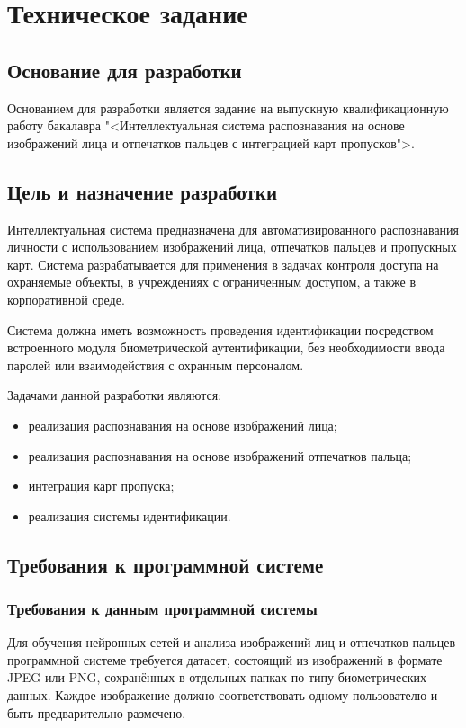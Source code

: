 \section{Техническое задание}
\subsection{Основание для разработки}

Основанием для разработки является задание на выпускную квалификационную работу бакалавра "<Интеллектуальная система распознавания на основе изображений лица и отпечатков пальцев с интеграцией карт пропусков">.

\subsection{Цель и назначение разработки}

Интеллектуальная система предназначена для автоматизированного распознавания личности с использованием изображений лица, отпечатков пальцев и пропускных карт. Система разрабатывается для применения в задачах контроля доступа на охраняемые объекты, в учреждениях с ограниченным доступом, а также в корпоративной среде.

Система должна иметь возможность проведения идентификации посредством встроенного модуля биометрической аутентификации, без необходимости ввода паролей или взаимодействия с охранным персоналом\cite{treb}.

Задачами данной разработки являются:
\begin{itemize}
\item реализация распознавания на основе изображений лица;
\item реализация распознавания на основе изображений отпечатков пальца;
\item интеграция карт пропуска;
\item реализация системы идентификации.
\end{itemize}

\subsection{Требования к программной системе}

\subsubsection{Требования к данным программной системы}

Для обучения нейронных сетей и анализа изображений лиц и отпечатков пальцев программной системе требуется датасет, состоящий из изображений в формате JPEG или PNG, сохранённых в отдельных папках по типу биометрических данных. Каждое изображение должно соответствовать одному пользователю и быть предварительно размечено\cite{learning}.

